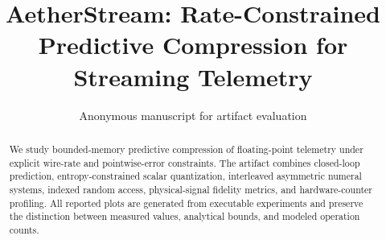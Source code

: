 \IfFileExists{IEEEtran.cls}{\documentclass[10pt,journal]{IEEEtran}}{\documentclass[10pt,twocolumn]{article}}
\title{AetherStream: Rate-Constrained Predictive Compression for Streaming Telemetry}
\author{Anonymous manuscript for artifact evaluation}
\begin{document}
\maketitle
\begin{abstract}
We study bounded-memory predictive compression of floating-point telemetry under explicit wire-rate and pointwise-error constraints. The artifact combines closed-loop prediction, entropy-constrained scalar quantization, interleaved asymmetric numeral systems, indexed random access, physical-signal fidelity metrics, and hardware-counter profiling. All reported plots are generated from executable experiments and preserve the distinction between measured values, analytical bounds, and modeled operation counts.
\end{abstract}







\end{document}

